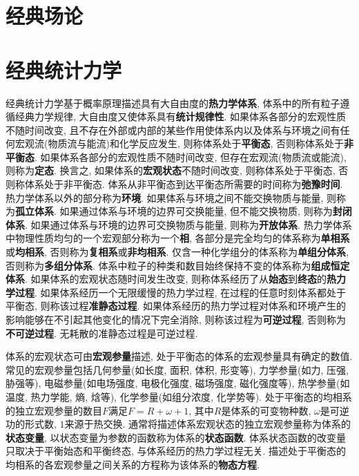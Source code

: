 \section[经典场论]{经典场论}\label{经典场论}




\newpage
\section[经典统计力学]{经典统计力学}\label{经典统计力学}
经典统计力学基于概率原理描述具有大自由度的\textbf{热力学体系}, 体系中的所有粒子遵循经典力学规律, 大自由度又使体系具有\textbf{统计规律性}. 如果体系各部分的宏观性质不随时间改变, 且不存在外部或内部的某些作用使体系内以及体系与环境之间有任何宏观流(物质流与能流)和化学反应发生, 则称体系处于\textbf{平衡态}, 否则称体系处于\textbf{非平衡态}. 如果体系各部分的宏观性质不随时间改变, 但存在宏观流(物质流或能流), 则称为\textbf{定态}. 换言之, 如果体系的\textbf{宏观状态}不随时间改变, 则称体系处于平衡态, 否则称体系处于非平衡态. 体系从非平衡态到达平衡态所需要的时间称为\textbf{弛豫时间}. 热力学体系以外的部分称为\textbf{环境}. 如果体系与环境之间不能交换物质与能量, 则称为\textbf{孤立体系}. 如果通过体系与环境的边界可交换能量, 但不能交换物质, 则称为\textbf{封闭体系}. 如果通过体系与环境的边界可交换物质与能量, 则称为\textbf{开放体系}. 热力学体系中物理性质均匀的一个宏观部分称为一个\textbf{相}, 各部分是完全均匀的体系称为\textbf{单相系}或\textbf{均相系}, 否则称为\textbf{复相系}或\textbf{非均相系}. 仅含一种化学组分的体系称为\textbf{单组分体系}, 否则称为\textbf{多组分体系}. 体系中粒子的种类和数目始终保持不变的体系称为\textbf{组成恒定体系}. 如果体系的宏观状态随时间发生改变, 则称体系经历了从\textbf{始态}到\textbf{终态}的\textbf{热力学过程}. 如果体系经历一个无限缓慢的热力学过程, 在过程的任意时刻体系都处于平衡态, 则称该过程\textbf{准静态过程}. 如果体系经历的热力学过程对体系和环境产生的影响能够在不引起其他变化的情况下完全消除, 则称该过程为\textbf{可逆过程}, 否则称为\textbf{不可逆过程}. 无耗散的准静态过程是可逆过程.

体系的宏观状态可由\textbf{宏观参量}描述, 处于平衡态的体系的宏观参量具有确定的数值. 常见的宏观参量包括几何参量(如长度, 面积, 体积, 形变等), 力学参量(如力, 压强, 胁强等), 电磁参量(如电场强度, 电极化强度, 磁场强度, 磁化强度等), 热学参量(如温度, 热力学能, 熵, 焓等), 化学参量(如组分浓度, 化学势等). 处于平衡态的均相系的独立宏观参量的数目$ F $满足$ F=R+\omega+1 $, 其中$ R $是体系的可变物种数, $ \omega $是可逆功的形式数, $ 1 $来源于热交换. 通常将描述体系宏观状态的独立宏观参量称为体系的\textbf{状态变量}, 以状态变量为参数的函数称为体系的\textbf{状态函数}. 体系状态函数的改变量只取决于平衡始态和平衡终态, 与体系经历的热力学过程无关. 描述处于平衡态的均相系的各宏观参量之间关系的方程称为该体系的\textbf{物态方程}.

